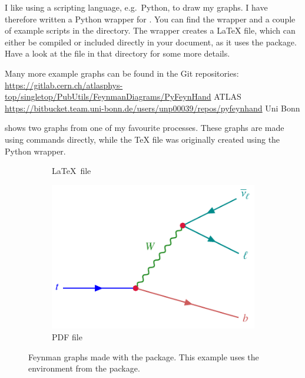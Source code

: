 I like using a scripting language, e.g.\ Python, to draw my graphs.
I have therefore written a Python wrapper for .
You can find the wrapper and a couple of example scripts in the  directory.
The wrapper creates a \LaTeX{} file,
which can either be compiled or included directly in your document,
as it uses the  package.
Have a look at the  file in that directory for some more details.

Many more example graphs can be found in the Git repositories:\\
\url{https://gitlab.cern.ch/atlasphys-top/singletop/PubUtils/FeynmanDiagrams/PyFeynHand} ATLAS\\
\url{https://bitbucket.team.uni-bonn.de/users/unp00039/repos/pyfeynhand} Uni Bonn

 shows two graphs from one of my favourite processes.
These graphs are made using  commands directly,
while the \TeX{} file was originally created using the Python wrapper.

\begin{figure}[htbp]
  \centering
  \begin{subfigure}{0.5\figwidth}
    \centering
    \caption{\LaTeX\ file}%
    \label{fig:feyn:tdecay1}
  \end{subfigure}
  \qquad
  \begin{subfigure}{0.5\figwidth}
    \centering
    \includegraphics[width=0.5\figwidth]{../tikz/tdecay}
    \caption{PDF file}%
    \label{fig:feyn:tdecay2}
  \end{subfigure}
  \caption{Feynman graphs made with the  package.
    This example uses the  environment from the  package.}%
  \label{fig:feyn:tdecay}
\end{figure}

